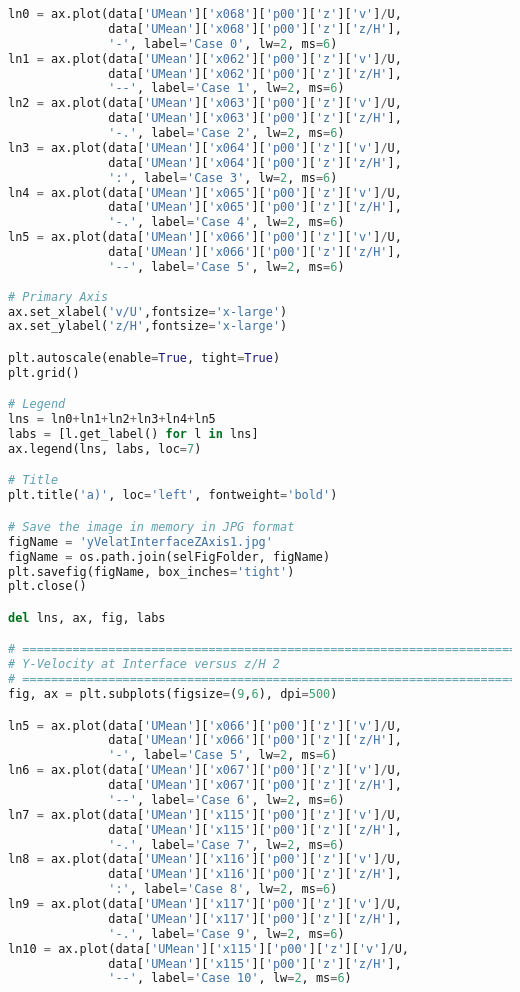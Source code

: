 \begin{lstlisting}[language=python]
ln0 = ax.plot(data['UMean']['x068']['p00']['z']['v']/U,
              data['UMean']['x068']['p00']['z']['z/H'],
              '-', label='Case 0', lw=2, ms=6)
ln1 = ax.plot(data['UMean']['x062']['p00']['z']['v']/U,
              data['UMean']['x062']['p00']['z']['z/H'],
              '--', label='Case 1', lw=2, ms=6)
ln2 = ax.plot(data['UMean']['x063']['p00']['z']['v']/U,
              data['UMean']['x063']['p00']['z']['z/H'],
              '-.', label='Case 2', lw=2, ms=6)
ln3 = ax.plot(data['UMean']['x064']['p00']['z']['v']/U,
              data['UMean']['x064']['p00']['z']['z/H'],
              ':', label='Case 3', lw=2, ms=6)
ln4 = ax.plot(data['UMean']['x065']['p00']['z']['v']/U,
              data['UMean']['x065']['p00']['z']['z/H'],
              '-.', label='Case 4', lw=2, ms=6)
ln5 = ax.plot(data['UMean']['x066']['p00']['z']['v']/U,
              data['UMean']['x066']['p00']['z']['z/H'],
              '--', label='Case 5', lw=2, ms=6)
    
# Primary Axis
ax.set_xlabel('v/U',fontsize='x-large')
ax.set_ylabel('z/H',fontsize='x-large')

plt.autoscale(enable=True, tight=True)
plt.grid()

# Legend
lns = ln0+ln1+ln2+ln3+ln4+ln5
labs = [l.get_label() for l in lns]
ax.legend(lns, labs, loc=7)

# Title
plt.title('a)', loc='left', fontweight='bold')

# Save the image in memory in JPG format
figName = 'yVelatInterfaceZAxis1.jpg'
figName = os.path.join(selFigFolder, figName)
plt.savefig(figName, box_inches='tight')
plt.close()

del lns, ax, fig, labs

# =============================================================================
# Y-Velocity at Interface versus z/H 2
# =============================================================================
fig, ax = plt.subplots(figsize=(9,6), dpi=500)

ln5 = ax.plot(data['UMean']['x066']['p00']['z']['v']/U,
              data['UMean']['x066']['p00']['z']['z/H'],
              '-', label='Case 5', lw=2, ms=6)
ln6 = ax.plot(data['UMean']['x067']['p00']['z']['v']/U,
              data['UMean']['x067']['p00']['z']['z/H'],
              '--', label='Case 6', lw=2, ms=6)
ln7 = ax.plot(data['UMean']['x115']['p00']['z']['v']/U,
              data['UMean']['x115']['p00']['z']['z/H'],
              '-.', label='Case 7', lw=2, ms=6)
ln8 = ax.plot(data['UMean']['x116']['p00']['z']['v']/U,
              data['UMean']['x116']['p00']['z']['z/H'],
              ':', label='Case 8', lw=2, ms=6)
ln9 = ax.plot(data['UMean']['x117']['p00']['z']['v']/U,
              data['UMean']['x117']['p00']['z']['z/H'],
              '-.', label='Case 9', lw=2, ms=6)
ln10 = ax.plot(data['UMean']['x115']['p00']['z']['v']/U,
              data['UMean']['x115']['p00']['z']['z/H'],
              '--', label='Case 10', lw=2, ms=6)
    

\end{lstlisting}
